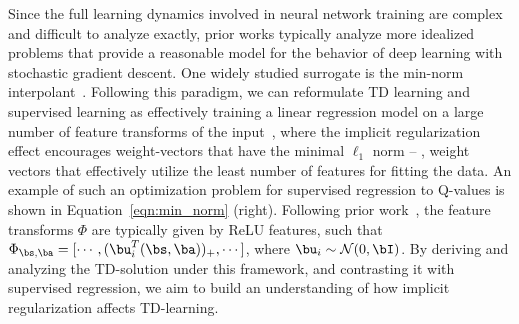 Since the full learning dynamics involved in neural network training are complex and difficult to analyze exactly, prior works typically analyze more idealized problems that provide a reasonable model for the behavior of deep learning with stochastic gradient descent. One widely studied surrogate is the min-norm interpolant~\citep{hastie2019surprises}.
Following this paradigm, we can reformulate TD learning and supervised learning as effectively training a linear regression model on a large number of feature transforms of the input~\citep{wei2019regularization,savarese2019infinite}, where the implicit regularization effect encourages weight-vectors that have the minimal $\ell_1$ norm -- \ie, weight vectors that effectively utilize the least number of features for fitting the data. An example of such an optimization problem for supervised regression to Q-values is shown in Equation~\ref{eqn:min_norm} (right). Following prior work~\citep{wei2019regularization}, the feature transforms
$\Phi$ are typically given by ReLU features, such that $\Phi_{\bs, \ba} = [\cdots, (\bu_i^T (\bs, \ba))_{+}, \cdots]$, where $\bu_i \sim \mathcal{N}(0, \bI)$.
By deriving and analyzing the TD-solution under this framework, and contrasting it with supervised regression, we aim to build an understanding of how implicit regularization affects TD-learning.

